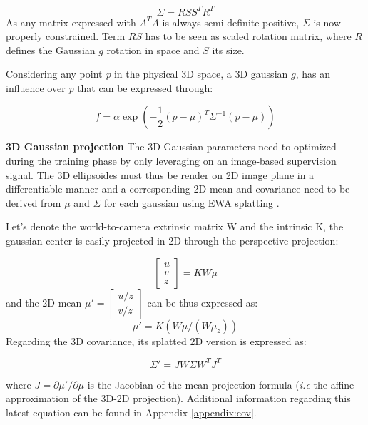 \begin{equation}
    \Sigma = RSS^{T}R^{T}
\end{equation}
As any matrix expressed with $A^{T}A$ is always semi-definite positive, $\Sigma$ is now properly constrained. Term $RS$ has to be seen as scaled rotation matrix, where $R$ defines the Gaussian $g$ rotation in space and $S$ its size. 

Considering any point \textit{p} in the physical 3D space, a 3D gaussian $g$, has an influence over \textit{p} that can be expressed through: 

\begin{equation}
  f = \alpha\exp(-\frac{1}{2}(p-\mu)^{T}\Sigma^{-1}(p-\mu))
\end{equation}

\noindent \textbf{3D Gaussian projection} The 3D Gaussian parameters need to optimized during the training phase by only leveraging on an image-based supervision signal. The 3D ellipsoides must thus be render on 2D image plane in a differentiable manner and a corresponding 2D mean and covariance need to be derived from $\mu$ and $\Sigma$ for each gaussian using EWA splatting \citep{zwicker2001ewa}. 

Let's denote the world-to-camera extrinsic matrix W and the intrinsic K, the gaussian center is easily projected in 2D through the perspective projection: 

\begin{equation}
  \begin{bmatrix}
    u \\
    v \\
    z
  \end{bmatrix} = KW\mu
\end{equation}
and the 2D mean $\mu' = \begin{bmatrix}
  u/z \\
  v/z
\end{bmatrix}$ can be  thus expressed as:
\begin{equation}
  \mu' = K(W\mu/(W\mu_{z}))
\end{equation}
Regarding the 3D covariance, its splatted 2D version is expressed as:

\begin{equation}
  \Sigma'= JW\Sigma W^{T}J^{T}
\end{equation}

where $J = \partial \mu' / \partial \mu$ is the Jacobian of the mean projection formula (\textit{i.e} the affine approximation of the 3D-2D projection). Additional information regarding this latest equation can be found in Appendix \ref{appendix:cov}. 

